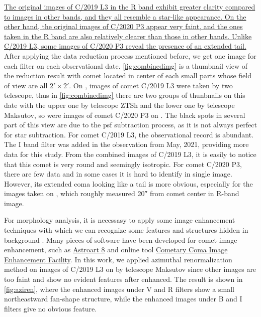 \ul{The original images of C/2019 L3 in the R band exhibit greater clarity compared to images in other bands, and they all resemble a star-like appearance. On the other hand, the original images of C/2020 P3 appear very faint, and the ones taken in the R band are also relatively clearer than those in other bands. Unlike C/2019 L3, some images of C/2020 P3 reveal the presence of an extended tail.} After applying the data reduction process mentioned before, we get one image for each filter on each observational date. \autoref{fig:combinedimg} is a thumbnail view of the reduction result with comet located in center of each small parts whose field of view are all $\ang{;2;} \times \ang{;2;}$. On , images of comet C/2019 L3 were taken by two telescope, thus in \autoref{fig:combinedimg} there are two groups of thunbnails on this date with the upper one by telescope ZTSh and the lower one by telescope Maksutov, so were images of comet C/2020 P3 on . The black spots in several part of this view are due to the psf subtraction process, as it is not always perfect for star subtraction. For comet C/2019 L3, the observational record is abundant. The I band filter was added in the observation from May, 2021, providing more data for this study. From the combined images of C/2019 L3, it is easily to notice that this comet is very round and seemingly isotropic. For comet C/2020 P3, there are few data and in some cases it is hard to identify in single image. However, its extended coma looking like a tail is more obvious, especially for the images taken on , which roughly measured \ang{;;20} from comet center in R-band image. 

For morphology analysis, it is necessasy to apply some image enhancement techniques with which we can recognize some features and structures hidden in background \citep{samarasinha_image_2014}. Many pieces of software have been developed for comet image enhancement, such as {\href{https://www.msb-astroart.com/down_en.htm}{Astroart 8}} and online tool {\href{https://www.psi.edu/research/cometimen}{Cometary Coma Image Enhancement Facility}}. In this work, 
we applied azimuthal renormalization method on images of C/2019 L3 on  by telescope Maksutov since other images are too faint and show no evident features after enhanced. The result is shown in \autoref{fig:aziren}, where the enhanced images under V and R filters show a small northeastward fan-shape structure, while the enhanced images under B and I filters give no obvious feature.  

